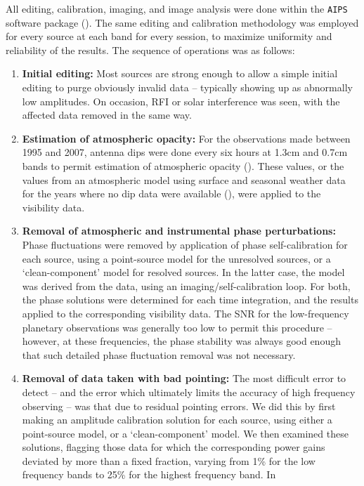 \documentclass{aastex}
\begin{document}
All editing, calibration, imaging, and image analysis were done within
the {\tt AIPS} software package (\citet{Gre04}).  The same editing and
calibration methodology was employed for every source at each band for
every session, to maximize uniformity and reliability of the results.
The sequence of operations was as follows:
\begin{enumerate}
\item {\bf Initial editing:} Most sources are strong enough to allow a
  simple initial editing to purge obviously invalid data -- typically
  showing up as abnormally low amplitudes.  On occasion, RFI or solar
  interference was seen, with the affected data removed in the same
  way.
\item {\bf Estimation of atmospheric opacity:} For the observations
  made between 1995 and 2007, antenna dips were done every six hours
  at 1.3cm and 0.7cm bands to permit estimation of atmospheric opacity
  (\citet{But96}).  These values, or the values from an atmospheric
  model using surface and seasonal weather data for the years where no
  dip data were available (\citet{But02}), were applied to the
  visibility data.
\item {\bf Removal of atmospheric and instrumental phase
  perturbations:} Phase fluctuations were removed by application of
  phase self-calibration for each source, using a point-source model
  for the unresolved sources, or a `clean-component' model for
  resolved sources.  In the latter case, the model was derived from
  the data, using an imaging/self-calibration loop.  For both, the
  phase solutions were determined for each time integration, and the
  results applied to the corresponding visibility data.  The SNR for
  the low-frequency planetary observations was generally too low to
  permit this procedure -- however, at these frequencies, the phase
  stability was always good enough that such detailed phase
  fluctuation removal was not necessary.
\item {\bf Removal of data taken with bad pointing:} The most
  difficult error to detect -- and the error which ultimately limits
  the accuracy of high frequency observing -- was that due to residual
  pointing errors.  We did this by first making an amplitude
  calibration solution for each source, using either a point-source
  model, or a `clean-component' model.  We then examined these
  solutions, flagging those data for which the corresponding power
  gains deviated by more than a fixed fraction, varying from 1\% for
  the low frequency bands to 25\% for the highest frequency band.  In

\end{enumerate}
\end{document}
